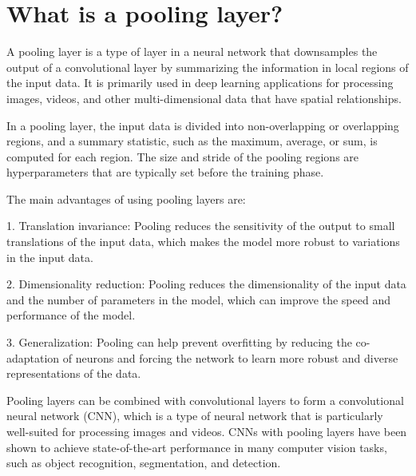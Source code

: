 \section{What is a pooling layer?}
A pooling layer is a type of layer in a neural network that downsamples the output of a convolutional layer by summarizing the information in local regions of the input data. It is primarily used in deep learning applications for processing images, videos, and other multi-dimensional data that have spatial relationships.

In a pooling layer, the input data is divided into non-overlapping or overlapping regions, and a summary statistic, such as the maximum, average, or sum, is computed for each region. The size and stride of the pooling regions are hyperparameters that are typically set before the training phase.

The main advantages of using pooling layers are:

1. Translation invariance: Pooling reduces the sensitivity of the output to small translations of the input data, which makes the model more robust to variations in the input data.

2. Dimensionality reduction: Pooling reduces the dimensionality of the input data and the number of parameters in the model, which can improve the speed and performance of the model.

3. Generalization: Pooling can help prevent overfitting by reducing the co-adaptation of neurons and forcing the network to learn more robust and diverse representations of the data.

Pooling layers can be combined with convolutional layers to form a convolutional neural network (CNN), which is a type of neural network that is particularly well-suited for processing images and videos. CNNs with pooling layers have been shown to achieve state-of-the-art performance in many computer vision tasks, such as object recognition, segmentation, and detection.

